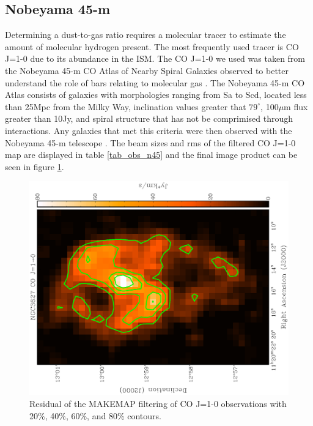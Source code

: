 
\subsection{Nobeyama 45-m}\label{nob_sec}

Determining a dust-to-gas ratio requires a molecular tracer to estimate the amount of molecular hydrogen present.  The most frequently used tracer is CO J=1-0 due to its abundance in the ISM.  The CO J=1-0 we used was taken from the Nobeyama 45-m CO Atlas of Nearby Spiral Galaxies observed to better understand the role of bars relating to molecular gas \citep{kuno2007}.  The Nobeyama 45-m CO Atlas consists of galaxies with morphologies ranging from Sa to Scd, located less than 25Mpc from the Milky Way, inclination values greater that $79^{\circ}$, 100$\mu$m flux greater than 10Jy, and spiral structure that has not be comprimised through interactions.  Any galaxies that met this criteria were then observed with the Nobeyama 45-m telescope \citep{kuno2007}.  The beam sizes and rms of the filtered CO J=1-0 map are displayed in table \ref{tab_obs_n45} and the final image product can be seen in figure \ref{fig_co10}.

\begin{figure}
  \centering
  \includegraphics[width=1.\textwidth, angle=270]{obs_imgs/CO10.eps}
  \caption[NGC3627 CO J=1-0 Observations]{Residual of the MAKEMAP filtering of CO J=1-0 observations with 20\%, 40\%, 60\%, and 80\% contours.}
  \label{fig_co10}
\end{figure}

